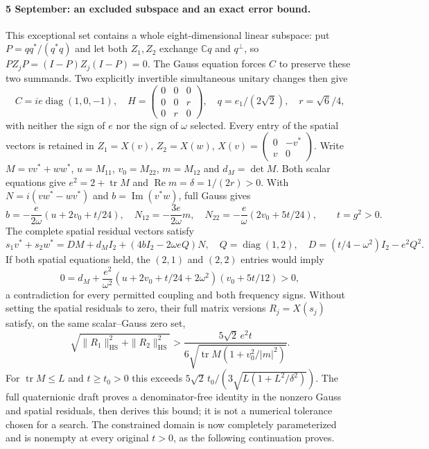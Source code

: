 \documentclass[10pt,letterpaper]{article}
\begin{document}
\paragraph{5 September: an excluded subspace and an exact error bound.}
This exceptional set contains a whole eight-dimensional linear subspace:
put $P=qq^*/(q^*q)$ and let both $Z_1,Z_2$ exchange $\mathbb Cq$
and $q^\perp$, so $PZ_jP=(I-P)Z_j(I-P)=0$.
The Gauss equation forces $C$ to preserve these two summands.
Two explicitly invertible simultaneous unitary changes then give
\[
 C=ie\operatorname{diag}(1,0,-1),\quad
 H=\begin{pmatrix}0&0&0\\0&0&r\\0&r&0\end{pmatrix},\quad
 q=e_1/(2\sqrt2),\quad r=\sqrt6/4,
\]
with neither the sign of $e$ nor the sign of $\omega$ selected.
Every entry of the spatial vectors is retained in
$Z_1=X(v)$, $Z_2=X(w)$, $X(v)=\left(\begin{smallmatrix}0&-v^*\\v&0\end{smallmatrix}\right)$.
Write $M=vv^*+ww^*$, $u=M_{11}$, $v_0=M_{22}$, $m=M_{12}$ and
$d_M=\det M$. Both scalar equations give
$e^2=2+\operatorname{tr}M$ and $\operatorname{Re}m=\delta=1/(2r)>0$.
With $N=i(vw^*-wv^*)$ and $b=\operatorname{Im}(v^*w)$, full Gauss gives
\[
 b=-\frac e{2\omega}(u+2v_0+t/24),\quad
 N_{12}=-\frac{3e}{2\omega}m,\quad
 N_{22}=-\frac e\omega(2v_0+5t/24),\qquad t=g^2>0.
\]
The complete spatial residual vectors satisfy
\[
 s_1v^*+s_2w^*=DM+d_MI_2+(4bI_2-2\omega eQ)N,\quad
 Q=\operatorname{diag}(1,2),\quad D=(t/4-\omega^2)I_2-e^2Q^2.
\]
If both spatial equations held, the $(2,1)$ and $(2,2)$ entries
would imply
\[
 0=d_M+\frac{e^2}{\omega^2}
       (u+2v_0+t/24+2\omega^2)(v_0+5t/12)>0,
\]
a contradiction for every permitted coupling and both frequency signs.
Without setting the spatial residuals to zero, their full matrix versions
$R_j=X(s_j)$ satisfy, on the same scalar--Gauss zero set,
\[
 \sqrt{\|R_1\|_{\mathrm{HS}}^2+\|R_2\|_{\mathrm{HS}}^2}
 >\frac{5\sqrt2\,e^2t}
 {6\sqrt{\operatorname{tr}M(1+v_0^2/|m|^2)}}.
\]
For $\operatorname{tr}M\leq L$ and $t\geq t_0>0$ this exceeds
$5\sqrt2\,t_0/(3\sqrt{L(1+L^2/\delta^2)})$.
The full quaternionic draft proves a denominator-free identity in the
nonzero Gauss and spatial residuals, then derives this bound; it is not
a numerical tolerance chosen for a search. The constrained domain is
now completely parameterized and is nonempty at every original $t>0$,
as the following continuation proves.
\end{document}

